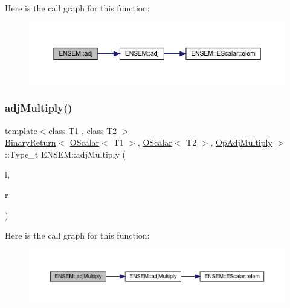 Here is the call graph for this function\+:\nopagebreak
\begin{figure}[H]
\begin{center}
\leavevmode
\includegraphics[width=350pt]{d1/d71/group__obsscalar_ga08302e6d2883f4f095a5e579bce6b2b8_cgraph}
\end{center}
\end{figure}
\mbox{\label{group__obsscalar_ga98359922a5222cb069e48d5b6916390e}} 
\subsubsection{\texorpdfstring{adjMultiply()}{adjMultiply()}}
{\footnotesize\ttfamily template$<$class T1 , class T2 $>$ \\
\mbox{\hyperlink{structENSEM_1_1BinaryReturn}{Binary\+Return}}$<$ \mbox{\hyperlink{classENSEM_1_1OScalar}{O\+Scalar}}$<$ T1 $>$, \mbox{\hyperlink{classENSEM_1_1OScalar}{O\+Scalar}}$<$ T2 $>$, \mbox{\hyperlink{structENSEM_1_1OpAdjMultiply}{Op\+Adj\+Multiply}} $>$\+::Type\+\_\+t E\+N\+S\+E\+M\+::adj\+Multiply (\begin{DoxyParamCaption}\item[{const \mbox{\hyperlink{classENSEM_1_1OScalar}{O\+Scalar}}$<$ T1 $>$ \&}]{l,  }\item[{const \mbox{\hyperlink{classENSEM_1_1OScalar}{O\+Scalar}}$<$ T2 $>$ \&}]{r }\end{DoxyParamCaption})\hspace{0.3cm}{\ttfamily [inline]}}

Here is the call graph for this function\+:\nopagebreak
\begin{figure}[H]
\begin{center}
\leavevmode
\includegraphics[width=350pt]{d1/d71/group__obsscalar_ga98359922a5222cb069e48d5b6916390e_cgraph}
\end{center}
\end{figure}
\mbox{\label{group__obsscalar_ga53406445c0fa210f9ed3a41ab077b31e}} 

